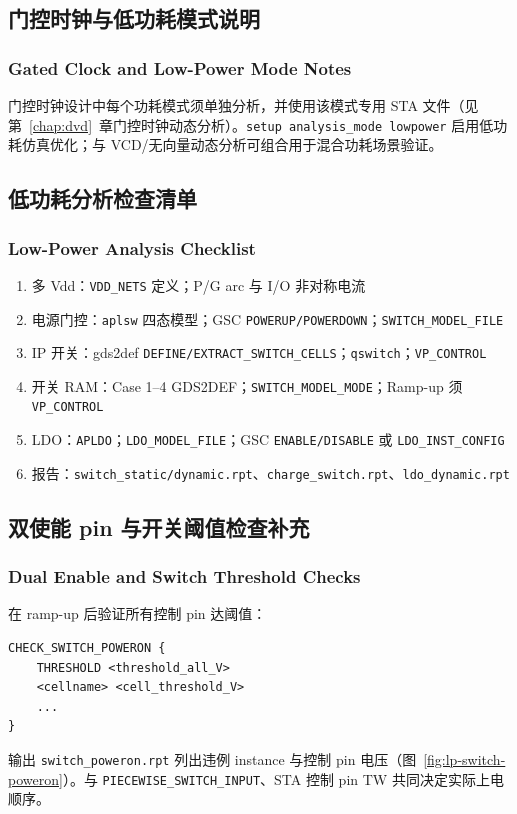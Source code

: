 \subsection{门控时钟与低功耗模式说明}
\subsubsection*{Gated Clock and Low-Power Mode Notes}

门控时钟设计中每个功耗模式须单独分析，并使用该模式专用 STA 文件（见第~\ref{chap:dvd}~章门控时钟动态分析）。\texttt{setup analysis\_mode lowpower} 启用低功耗仿真优化；与 VCD/无向量动态分析可组合用于混合功耗场景验证。

\subsection{低功耗分析检查清单}
\subsubsection*{Low-Power Analysis Checklist}

\begin{enumerate}
  \item 多 Vdd：\texttt{VDD\_NETS} 定义；P/G arc 与 I/O 非对称电流
  \item 电源门控：\texttt{aplsw} 四态模型；GSC \texttt{POWERUP/POWERDOWN}；\texttt{SWITCH\_MODEL\_FILE}
  \item IP 开关：gds2def \texttt{DEFINE/EXTRACT\_SWITCH\_CELLS}；\texttt{qswitch}；\texttt{VP\_CONTROL}
  \item 开关 RAM：Case 1--4 GDS2DEF；\texttt{SWITCH\_MODEL\_MODE}；Ramp-up 须 \texttt{VP\_CONTROL}
  \item LDO：\texttt{APLDO}；\texttt{LDO\_MODEL\_FILE}；GSC \texttt{ENABLE/DISABLE} 或 \texttt{LDO\_INST\_CONFIG}
  \item 报告：\texttt{switch\_static/dynamic.rpt}、\texttt{charge\_switch.rpt}、\texttt{ldo\_dynamic.rpt}
\end{enumerate}

\subsection{双使能 pin 与开关阈值检查补充}
\subsubsection*{Dual Enable and Switch Threshold Checks}

 在 ramp-up 后验证所有控制 pin 达阈值：
\begin{lstlisting}
CHECK_SWITCH_POWERON {
    THRESHOLD <threshold_all_V>
    <cellname> <cell_threshold_V>
    ...
}
\end{lstlisting}
输出 \texttt{switch\_poweron.rpt} 列出违例 instance 与控制 pin 电压（图~\ref{fig:lp-switch-poweron}）。与 \texttt{PIECEWISE\_SWITCH\_INPUT}、STA 控制 pin TW 共同决定实际上电顺序。

